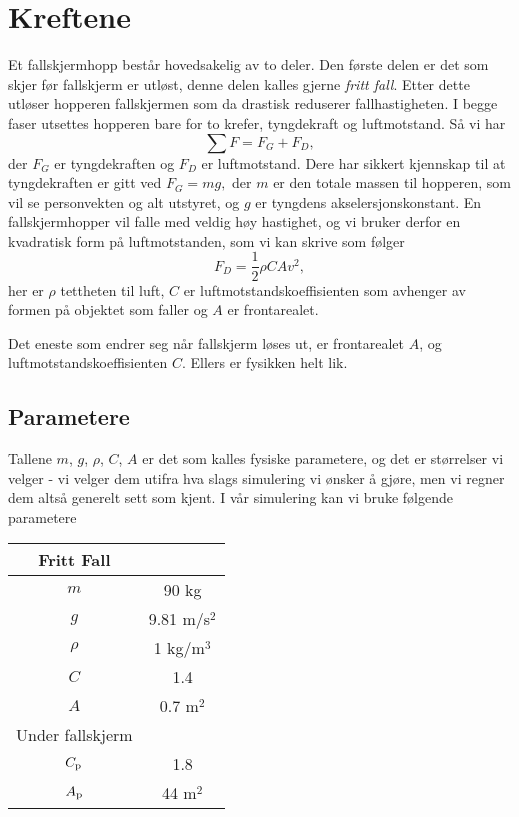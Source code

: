 \documentclass[a4paper, 11pt, notitlepage]{article}
\begin{document}
\section*{Kreftene}


Et fallskjermhopp består hovedsakelig av to deler. Den første delen er det som skjer før fallskjerm er utløst, denne delen kalles gjerne \emph{fritt fall}. Etter dette utløser hopperen fallskjermen som da drastisk reduserer fallhastigheten. I begge faser utsettes hopperen bare for to krefer, tyngdekraft og luftmotstand. Så vi har
$$\sum F = F_G + F_D,$$
der $F_G$ er tyngdekraften og $F_D$ er luftmotstand. Dere har sikkert kjennskap til at tyngdekraften er gitt ved
$F_G = mg,$
der $m$ er den totale massen til hopperen, som vil se personvekten og alt utstyret, og $g$ er tyngdens akselersjonskonstant.  En fallskjermhopper vil falle med veldig høy hastighet, og vi bruker derfor en kvadratisk form på luftmotstanden, som vi kan skrive som følger
$$F_D = \frac{1}{2}\rho C A v^2,$$
her er $\rho$ tettheten til luft, $C$ er luftmotstandskoeffisienten som avhenger av formen på objektet som faller og $A$ er frontarealet.

Det eneste som endrer seg når fallskjerm løses ut, er frontarealet $A$, og luftmotstandskoeffisienten $C$. Ellers er fysikken helt lik.

\subsection*{Parametere}
Tallene $m$, $g$, $\rho$, $C$, $A$ er det som kalles fysiske parametere, og det er størrelser vi velger - vi velger dem utifra hva slags simulering vi ønsker å gjøre, men vi regner dem altså generelt sett som kjent. I vår simulering kan vi bruke følgende parametere
\begin{center}
\begin{tabular}{c|c}
Fritt Fall \\ \hline
$m$ & 90 kg \\ \hline
$g$ & 9.81 m/s$^2$ \\ \hline
$\rho$ & 1 kg/m$^3$\\ \hline
$C$ & 1.4 \\ \hline
$A$ & 0.7 m$^2$\\ \hline \hline
Under fallskjerm \\ \hline
$C_{\rm p}$ & 1.8 \\ \hline
$A_{\rm p}$ & 44 m$^2$
\end{tabular}
\end{center}
\end{document}
